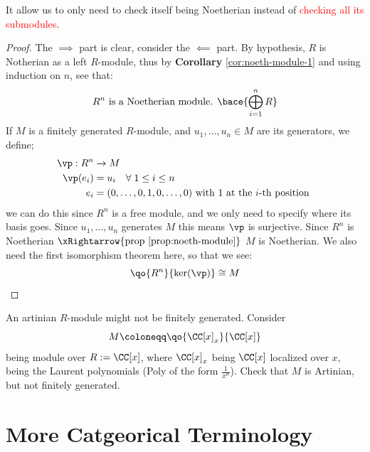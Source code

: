 \begin{note}
	It allow us to only need to check itself being Noetherian instead of \textcolor{red}{checking all its submodules}.
\end{note}

\begin{proof}
	The \( \implies \) part is clear, consider the \( \impliedby \) part. By hypothesis, \( R \) is
	Notherian as a left \( R \)-module, thus by \textbf{Corollary} \ref{cor:noeth-module-1}
	and using induction on \( n \), see that:
	\[
		R^n \text{ is a Noetherian module. } \bace{\bigoplus_{i=1}^n R}
	\]
	If \( M \) is a finitely generated \( R \)-module, and \( u_1,\ldots,u_n \in M \) are its
	generators, we define;
	\[
		\begin{aligned}
			\vp: R^n & \to M                                                                              \\
			\vp(e_i) & = u_i \quad \forall \; 1\leq i \leq n                                              \\
			e_i      & = (0, \ldots, 0, 1, 0, \ldots, 0) \text{ with \( 1 \) at the \( i \)-th position }
		\end{aligned}
	\]
	we can do this since \( R^n \) is a free module, and we only need to specify where its basis goes.
	Since \( u_1,\ldots,u_n \) generates \( M \) this means \( \vp \) is surjective. Since \( R^n \)
	is Noetherian \( \xRightarrow{\text{prop } \ref{prop:noeth-module}} \) \( M \) is
	Noetherian. We also need the first isomorphism theorem here, so that we see:
	\[
		\qo{R^n}{\ker(\vp)} \cong  M
	\]
\end{proof}

\begin{exercise}
	An artinian \( R \)-module might not be finitely generated. Consider
	\[
		M \coloneqq  \qo{\CC[x]_x}{\CC[x]}
	\]
	being module over \( R:= \CC[x] \), where \( \CC[x]_x \) being \( \CC[x] \) localized over \( x
	\), being the Laurent polynomials (Poly of the form \( \frac{1}{x^n} \)). Check that \( M \) is Artinian, but not finitely generated.
\end{exercise}

\section{More Catgeorical Terminology}

